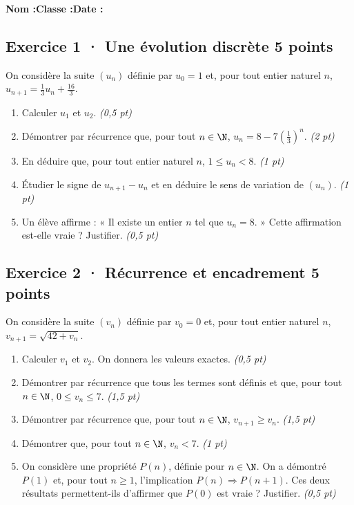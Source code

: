 \smallskip\textbf{Nom :}\enspace\dotfill\quad\textbf{Classe :}\enspace\dotfill\quad\textbf{Date :}\enspace\dotfill

\subsection*{Exercice 1 · Une évolution discrète \hfill 5 points}On considère la suite $(u_n)$ définie par $u_0=1$ et, pour tout entier naturel $n$, $u_{n+1}=\frac{1}{3}u_n+\frac{16}{3}$.

\begin{enumerate}

\item Calculer $u_1$ et $u_2$. \hfill\textit{(0,5 pt)}

\item Démontrer par récurrence que, pour tout $n\in\N$, $u_n=8-7\left(\frac{1}{3}\right)^n$. \hfill\textit{(2 pt)}

\item En déduire que, pour tout entier naturel $n$, $1\le u_n<8$. \hfill\textit{(1 pt)}

\item Étudier le signe de $u_{n+1}-u_n$ et en déduire le sens de variation de $(u_n)$. \hfill\textit{(1 pt)}

\item Un élève affirme : « Il existe un entier $n$ tel que $u_n=8$. » Cette affirmation est-elle vraie ? Justifier. \hfill\textit{(0,5 pt)}

\end{enumerate}

\subsection*{Exercice 2 · Récurrence et encadrement \hfill 5 points}On considère la suite $(v_n)$ définie par $v_0=0$ et, pour tout entier naturel $n$, $v_{n+1}=\sqrt{42+v_n}$.

\begin{enumerate}

\item Calculer $v_1$ et $v_2$. On donnera les valeurs exactes. \hfill\textit{(0,5 pt)}

\item Démontrer par récurrence que tous les termes sont définis et que, pour tout $n\in\N$, $0\le v_n\le7$. \hfill\textit{(1,5 pt)}

\item Démontrer par récurrence que, pour tout $n\in\N$, $v_{n+1}\ge v_n$. \hfill\textit{(1,5 pt)}

\item Démontrer que, pour tout $n\in\N$, $v_n<7$. \hfill\textit{(1 pt)}

\item On considère une propriété $P(n)$, définie pour $n\in\N$. On a démontré $P(1)$ et, pour tout $n\ge1$, l'implication $P(n)\Rightarrow P(n+1)$. Ces deux résultats permettent-ils d'affirmer que $P(0)$ est vraie ? Justifier. \hfill\textit{(0,5 pt)}

\end{enumerate}

